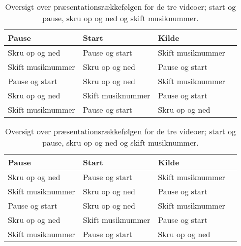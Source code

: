 \begin{table}[H]
	\centering
	\begin{tabular}{ | l | l | l | p{8cm} |}
		\hline
		\textbf{Pause} & \textbf{Start} & \textbf{Kilde} \\ \hline
		Skru op og ned & Pause og start & Skift musiknummer\\ \hline
		Skift musiknummer & Skru op og ned & Pause og start \\ \hline
		Pause og start & Skru op og ned & Skift musiknummer\\ \hline
		Skru op og ned & Skift musiknummer & Pause og start\\ \hline
		Skift musiknummer & Pause og start & Skru op og ned \\ \hline
	\end{tabular}
	\caption{Oversigt over præsentationsrækkefølgen for de tre videoer; start og pause, skru op og ned og skift musiknummer.}
	\label{tab:IndsamledeGestikkerSkift}
\end{table}
\noindent

\begin{table}[H]
	\centering
	\begin{tabular}{ | l | l | l | p{8cm} |}
		\hline
		\textbf{Pause} & \textbf{Start} & \textbf{Kilde} \\ \hline
		Skru op og ned & Pause og start & Skift musiknummer\\ \hline
		Skift musiknummer & Skru op og ned & Pause og start \\ \hline
		Pause og start & Skru op og ned & Skift musiknummer\\ \hline
		Skru op og ned & Skift musiknummer & Pause og start\\ \hline
		Skift musiknummer & Pause og start & Skru op og ned \\ \hline
	\end{tabular}
	\caption{Oversigt over præsentationsrækkefølgen for de tre videoer; start og pause, skru op og ned og skift musiknummer.}
	\label{tab:IndsamledeGestikkerVolumen}
\end{table}
\noindent